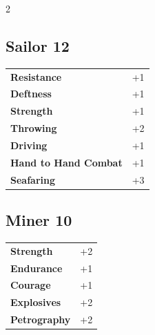 \begin{multicols}{2}
\begin{tcolorbox}

\end{tcolorbox}

\begin{tcolorbox}
    \subsection*{Sailor \hfill \small{12 }}
    \tcblower




\begin{tabular}{@{}ll@{}}
    \textbf{Resistance} & +1\\
    \textbf{Deftness} & +1\\
    \textbf{Strength} & +1\\
    \textbf{Throwing} & +2\\
    \textbf{Driving} & +1\\
    \textbf{Hand to Hand Combat} & +1\\
    \textbf{Seafaring} & +3\\
\end{tabular}


\end{tcolorbox}

\begin{tcolorbox}
    \subsection*{Miner \hfill \small{10 }}
    \tcblower




\begin{tabular}{@{}ll@{}}
    \textbf{Strength} & +2\\
    \textbf{Endurance} & +1\\
    \textbf{Courage} & +1\\
    \textbf{Explosives} & +2\\
    \textbf{Petrography} & +2\\
\end{tabular}



\end{tcolorbox}
\end{multicols}
